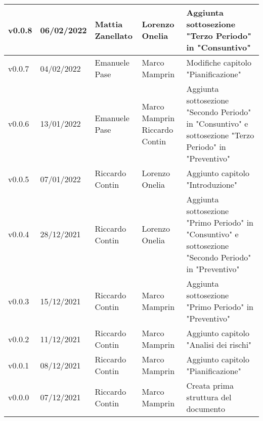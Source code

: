 {\begin{longtable}{|C{1.8cm}|C{2.1cm}|C{2cm}|C{2.4cm}|L{4.4cm}|}
  v0.0.8        & 06/02/2022    & Mattia Zanellato  & Lorenzo Onelia                  & Aggiunta sottosezione "Terzo Periodo" in "Consuntivo" \\ \hline
  v0.0.7        & 04/02/2022    & Emanuele Pase     & Marco Mamprin                   & Modifiche capitolo "Pianificazione" \\ \hline
  v0.0.6        & 13/01/2022    & Emanuele Pase     & Marco Mamprin Riccardo Contin   & Aggiunta sottosezione "Secondo Periodo" in "Consuntivo" e sottosezione "Terzo Periodo" in "Preventivo" \\ \hline
  v0.0.5        & 07/01/2022    & Riccardo Contin   & Lorenzo Onelia                  & Aggiunto capitolo "Introduzione" \\ \hline
  v0.0.4        & 28/12/2021    & Riccardo Contin   & Lorenzo Onelia                  & Aggiunta sottosezione "Primo Periodo" in "Consuntivo" e sottosezione "Secondo Periodo" in "Preventivo" \\ \hline
  v0.0.3        & 15/12/2021    & Riccardo Contin   & Marco Mamprin                   & Aggiunta sottosezione "Primo Periodo" in "Preventivo" \\ \hline
  v0.0.2        & 11/12/2021    & Riccardo Contin   & Marco Mamprin                   & Aggiunto capitolo "Analisi dei rischi" \\ \hline
  v0.0.1        & 08/12/2021    & Riccardo Contin   & Marco Mamprin                   & Aggiunto capitolo "Pianificazione" \\ \hline
  v0.0.0        & 07/12/2021    & Riccardo Contin   & Marco Mamprin                   & Creata prima struttura del documento \\ \hline
\end{longtable}}

\renewcommand\arraystretch{1}
